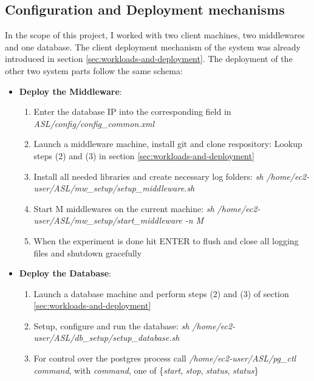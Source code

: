\documentclass[11pt]{article}
\begin{document}
\subsection{Configuration and Deployment mechanisms}\label{sec:configuration-and-deployment-mechanisms}
In the scope of this project, I worked with two client machines, two middlewares and one database. The client deployment mechanism of the system was already introduced in section \ref{sec:workloads-and-deployment}. The deployment of the other two system parts follow the same schema:
\begin{itemize}
	\item \textbf{Deploy the Middleware}:
	\begin{enumerate}
		\item Enter the database IP into the corresponding field in \textit{ASL/config/config\_common.xml}
		\item Launch a middleware machine, install git and clone respository: Lookup steps (2) and (3) in section \ref{sec:workloads-and-deployment}
		\item Install all needed libraries and create necessary log folders:\newline
		\textit{sh /home/ec2-user/ASL/mw\_setup/setup\_middleware.sh}
		\item Start M middlewares on the current machine:\newline
		\textit{sh /home/ec2-user/ASL/mw\_setup/start\_middleware -n M}
		\item When the experiment is done hit ENTER to flush and close all logging files and shutdown gracefully
	\end{enumerate}
	\item \textbf{Deploy the Database}:
	\begin{enumerate}
		\item Launch a database machine and perform steps (2) and (3) of section \ref{sec:workloads-and-deployment}
		\item Setup, configure and run the database: \newline
		\textit{sh /home/ec2-user/ASL/db\_setup/setup\_database.sh}
		\item For control over the postgres process call \textit{/home/ec2-user/ASL/pg\_ctl command}, with \textit{command}, one of \{\textit{start}, \textit{stop}, \textit{status}, \textit{status}\}
	\end{enumerate}
\end{itemize}
\end{document}
